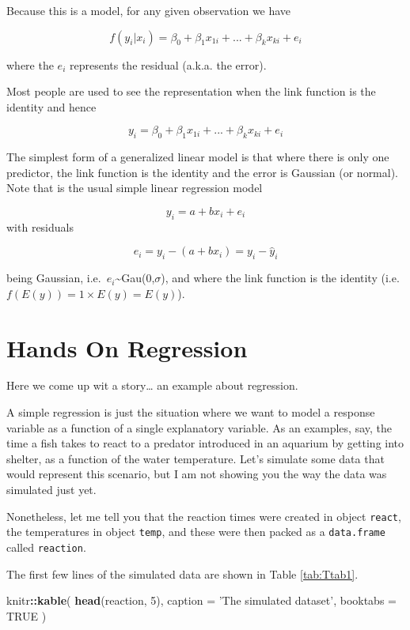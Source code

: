 \documentclass[
]{book}
\newenvironment{Shaded}{\begin{snugshade}}{\end{snugshade}}
\newcommand{\DataTypeTok}[1]{\textcolor[rgb]{0.13,0.29,0.53}{#1}}
\newcommand{\DecValTok}[1]{\textcolor[rgb]{0.00,0.00,0.81}{#1}}
\newcommand{\KeywordTok}[1]{\textcolor[rgb]{0.13,0.29,0.53}{\textbf{#1}}}
\newcommand{\NormalTok}[1]{#1}
\newcommand{\OperatorTok}[1]{\textcolor[rgb]{0.81,0.36,0.00}{\textbf{#1}}}
\newcommand{\OtherTok}[1]{\textcolor[rgb]{0.56,0.35,0.01}{#1}}
\newcommand{\StringTok}[1]{\textcolor[rgb]{0.31,0.60,0.02}{#1}}
\begin{document}
Because this is a model, for any given observation we have

\[ f{(y_i|x_i)} =  \beta_0+\beta_1 x_{1i} + ... + \beta_k x_{ki} + e_i \]

where the \(e_i\) represents the residual (a.k.a. the error).

Most people are used to see the representation when the link function is the identity and hence

\[ y_i =  \beta_0+\beta_1 x_{1i} + ... + \beta_k x_{ki} + e_i \]

The simplest form of a generalized linear model is that where there is only one predictor, the link function is the identity and the error is Gaussian (or normal). Note that is the usual simple linear regression model

\[y_i=a+bx_i+e_i\]
with residuals

\[e_i=y_i - (a+bx_i)= y_i-\hat y_i\]

being Gaussian, i.e.~\(e_i\)\textasciitilde Gau(0,\(\sigma\)), and where the link function is the identity (i.e.~\(f(E(y))=1 \times E(y)=E(y)\)).

\hypertarget{handson}{%
\chapter{Hands On Regression}\label{handson}}

Here we come up wit a story\ldots{} an example about regression.

A simple regression is just the situation where we want to model a response variable as a function of a single explanatory variable. As an examples, say, the time a fish takes to react to a predator introduced in an aquarium by getting into shelter, as a function of the water temperature. Let's simulate some data that would represent this scenario, but I am not showing you the way the data was simulated just yet.

Nonetheless, let me tell you that the reaction times were created in object \texttt{react}, the temperatures in object \texttt{temp}, and these were then packed as a \texttt{data.frame} called \texttt{reaction}.

The first few lines of the simulated data are shown in Table \ref{tab:Ttab1}.

\begin{Shaded}
\begin{Highlighting}[]
\NormalTok{knitr}\OperatorTok{::}\KeywordTok{kable}\NormalTok{(}
  \KeywordTok{head}\NormalTok{(reaction, }\DecValTok{5}\NormalTok{), }\DataTypeTok{caption =} \StringTok{'The simulated dataset'}\NormalTok{,}
  \DataTypeTok{booktabs =} \OtherTok{TRUE}
\NormalTok{)}
\end{Highlighting}
\end{Shaded}
\end{document}
